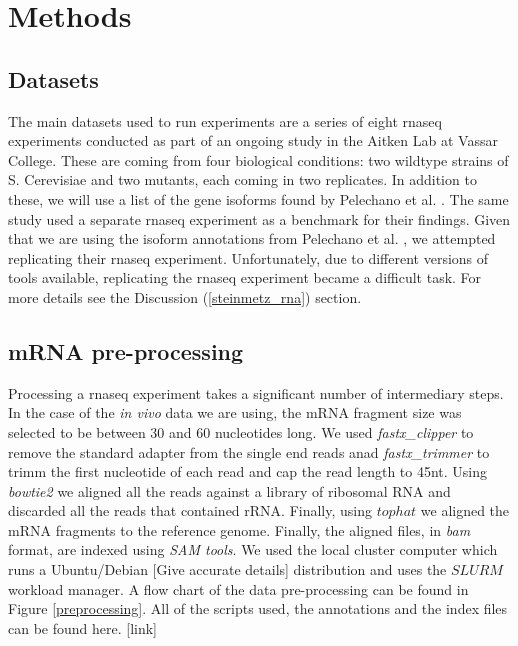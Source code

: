 \documentclass[12pt]{article}
\begin{document}
\section{Methods}
\subsection{Datasets}\label{datasets}

The main datasets used to run experiments are a series of eight \acrshort{rnaseq} experiments conducted as part of an ongoing study in the Aitken Lab at Vassar College. These are coming from four biological conditions: two wildtype strains of S. Cerevisiae and two mutants, each coming in two replicates. In addition to these, we will use a list of the gene isoforms found by Pelechano et al. \cite{Pelechano2013}. The same study \cite{Pelechano2013} used a separate \cite{Wilkening2013}  \acrshort{rnaseq} experiment as a benchmark for their findings. Given that we are using the isoform annotations from Pelechano et al. \cite{Pelechano2013}, we attempted replicating their \acrshort{rnaseq} experiment. Unfortunately, due to different versions of tools available, replicating the \acrshort{rnaseq} experiment became a difficult task. For more details see the Discussion (\ref{steinmetz_rna}) section. 

\subsection{mRNA pre-processing}
Processing a \acrshort{rnaseq} experiment takes a significant number of intermediary steps. In the case of the \textit{in vivo} data we are using, the mRNA fragment size was selected to be between 30 and 60 nucleotides long. We used \textit{fastx\_clipper} to remove the standard adapter from the single end reads anad \textit{fastx\_trimmer}  to trimm the first nucleotide of each read and cap the read length to 45nt. Using \textit{bowtie2} we aligned all the reads against a library of ribosomal RNA and discarded all the reads that  contained rRNA. Finally, using $tophat$ we aligned the mRNA fragments to the reference genome. Finally, the aligned files, in \textit{bam} format, are indexed using \textit{SAM tools}. We used the local cluster computer which runs a Ubuntu/Debian [Give accurate details] distribution and uses the $SLURM$ workload manager. A flow chart of the data pre-processing can be found in Figure \ref{preprocessing}. All of the scripts used, the annotations and the index files can be found here. [link]
\end{document}
